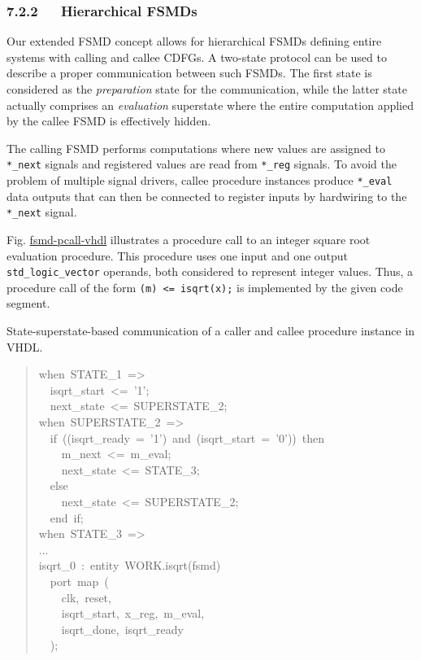 \documentclass[a4paper]{article}
\begin{document}
\subsubsection{7.2.2~~~Hierarchical FSMDs%
  \label{hierarchical-fsmds}%
}

Our extended FSMD concept allows for hierarchical FSMDs defining entire systems
with calling and callee CDFGs. A two-state protocol can be used to describe
a proper communication between such FSMDs. The first state is considered
as the \emph{preparation} state for the communication, while the latter state
actually comprises an \emph{evaluation} superstate where the entire computation
applied by the callee FSMD is effectively hidden.

The calling FSMD performs computations where new values are assigned
to \texttt{*\_next} signals and registered values are read from \texttt{*\_reg} signals. To
avoid the problem of multiple signal drivers, callee procedure instances produce
\texttt{*\_eval} data outputs that can then be connected to register inputs by
hardwiring to the \texttt{*\_next} signal.

Fig. \hyperref[fsmd-pcall-vhdl]{fsmd-pcall-vhdl} illustrates a procedure call to an integer square root
evaluation procedure. This procedure uses one input and one output
\texttt{std\_logic\_vector} operands, both considered to represent integer values.
Thus, a procedure call of the form \texttt{(m) <= isqrt(x);} is implemented by
the given code segment.

\label{fsmd-pcall-vhdl}
State-superstate-based communication of a caller and callee procedure instance
in VHDL.
%
\begin{quote}{\ttfamily \raggedright \noindent
when~STATE\_1~=>\\
~~isqrt\_start~<=~'1';\\
~~next\_state~<=~SUPERSTATE\_2;\\
when~SUPERSTATE\_2~=>\\
~~if~((isqrt\_ready~=~'1')~and~(isqrt\_start~=~'0'))~then\\
~~~~m\_next~<=~m\_eval;\\
~~~~next\_state~<=~STATE\_3;\\
~~else\\
~~~~next\_state~<=~SUPERSTATE\_2;\\
~~end~if;\\
when~STATE\_3~=>\\
...\\
isqrt\_0~:~entity~WORK.isqrt(fsmd)\\
~~port~map~(\\
~~~~clk,~reset,\\
~~~~isqrt\_start,~x\_reg,~m\_eval,\\
~~~~isqrt\_done,~isqrt\_ready\\
~~);
}
\end{quote}
\end{document}
